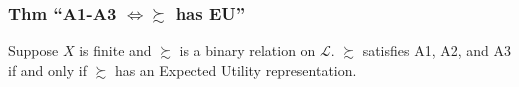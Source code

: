 \documentclass[
]{article}
\begin{document}
\hypertarget{thm-a1-a3-iff-succsim-has-eu}{%
\subsubsection{\texorpdfstring{Thm ``A1-A3 \(\iff \succsim\) has
EU''}{Thm ``A1-A3 \textbackslash iff \textbackslash succsim has EU''}}\label{thm-a1-a3-iff-succsim-has-eu}}

Suppose \(X\) is finite and \(\succsim\) is a binary relation on
\(\mathcal{L}\). \(\succsim\) satisfies A1, A2, and A3 if and only if
\(\succsim\) has an Expected Utility representation.
\end{document}
